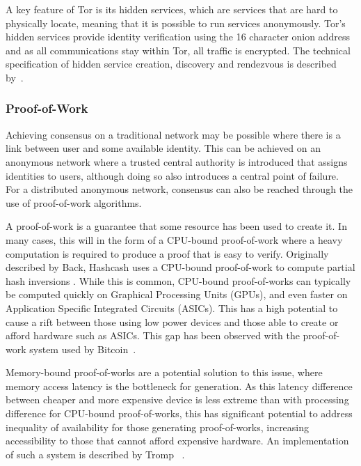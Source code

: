 			A key feature of Tor is its hidden services, which are services that are hard to physically locate, meaning that it is possible to run services anonymously. Tor's hidden services provide identity verification using the 16 character onion address and as all communications stay within Tor, all traffic is encrypted. The technical specification of hidden service creation, discovery and rendezvous is described by~\cite{tor_rend}.
			
		\subsubsection*{Proof-of-Work}
			Achieving consensus on a traditional network may be possible where there is a link between user and some available identity. This can be achieved on an anonymous network where a trusted central authority is introduced that assigns identities to users, although doing so also introduces a central point of failure. For a distributed anonymous network, consensus can also be reached through the use of proof-of-work algorithms.
			
			A proof-of-work is a guarantee that some resource has been used to create it. In many cases, this will in the form of a CPU-bound proof-of-work where a heavy computation is required to produce a proof that is easy to verify. Originally described by Back, Hashcash uses a CPU-bound proof-of-work to compute partial hash inversions \cite{back2002hashcash}. While this is common, CPU-bound proof-of-works can typically be computed quickly on Graphical Processing Units (GPUs), and even faster on Application Specific Integrated Circuits (ASICs). This has a high potential to cause a rift between those using low power devices and those able to create or afford hardware such as ASICs. This gap has been observed with the proof-of-work system used by Bitcoin~\cite{peck2013bitcoin}.
			
			Memory-bound proof-of-works are a potential solution to this issue, where memory access latency is the bottleneck for generation. As this latency difference between cheaper and more expensive device is less extreme than with processing difference for CPU-bound proof-of-works, this has significant potential to address inequality of availability for those generating proof-of-works, increasing accessibility to those that cannot afford expensive hardware. An implementation of such a system is described by Tromp ~\cite{cuckoo}.
